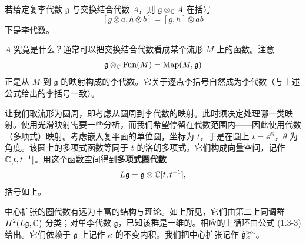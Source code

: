 
若给定复李代数 $\mathfrak g$ 与交换结合代数 $A$，则 $\mathfrak g\otimes_{\mathbb{C}} A$ 在括号
\[
    [g\otimes a,h\otimes b]=[g,h]\otimes ab
\]
下是李代数。

$A$ 究竟是什么？通常可以把交换结合代数看成某个流形 $M$ 上的函数。注意
\[
    \mathfrak g\otimes_{\mathbb{C}}\operatorname{Fun}(M)=\operatorname{Map}(M,\mathfrak g)
\]
正是从 $M$ 到 $\mathfrak g$ 的映射构成的李代数。它关于逐点李括号自然成为李代数（与上述公式给出的李括号一致）。


让我们取流形为圆周，即考虑从圆周到李代数的映射。此时须决定处理哪一类映射。使用光滑映射需要一些分析，而我们希望停留在代数范围内——因此使用代数（多项式）映射。考虑嵌入复平面的单位圆，坐标为 $t$，于是在圆上 $t=\ee^{\ii\theta}$，$\theta$ 为角度。该圆上的多项式函数等同于 $t$ 的洛朗多项式。它们构成向量空间，记作 $\mathbb{C}[t,t^{-1}]$。用这个函数空间得到\textbf{多项式圈代数}
\[
    L\mathfrak g=\mathfrak g\otimes\mathbb{C}[t,t^{-1}],
\]
括号如上。


中心扩张的圈代数有远为丰富的结构与理论。如上所见，它们由第二上同调群 $H^2(L\mathfrak g,\mathbb{C})$ 分类；对单李代数 $\mathfrak g$，已知该群是一维的。相应的上循环由公式 (1.3-3) 给出。它们依赖于 $\mathfrak g$ 上记作 $\kappa$ 的不变内积。我们把中心扩张记作 $\hat{\mathfrak{g}}^{\mathrm{pol}}_\kappa$。

